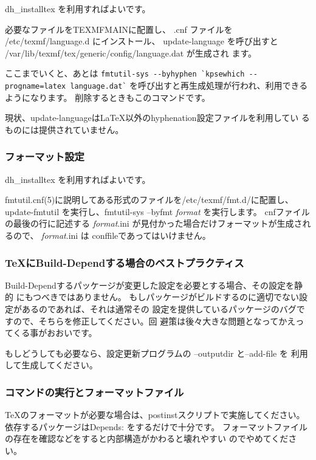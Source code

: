 \documentclass[mingoth,a4paper]{jsarticle}
\begin{document}
dh\_{}installtex を利用すればよいです。

必要なファイルをTEXMFMAINに配置し、
.cnf ファイルを /etc/texmf/language.d にインストール、 update-language
を呼び出すと /var/lib/texmf/tex/generic/config/language.dat が生成され
ます。

ここまでいくと、あとは
\verb!fmtutil-sys --byhyphen `kpsewhich --progname=latex language.dat`!
を呼び出すと再生成処理が行われ、利用できるようになります。
削除するときもこのコマンドです。

現状、update-languageは\LaTeX{}以外のhyphenation設定ファイルを利用してい
るものには提供されていません。

\subsubsection{フォーマット設定}

dh\_{}installtex を利用すればよいです。

fmtutil.cnf(5)に説明してある形式のファイルを/etc/texmf/fmt.d/に配置し、
 update-fmtutil を実行し、fmtutil-sys --byfmt {\it format} を実行します。
cnfファイルの最後の行に記述する {\it format}.ini が見付かった場合だけフォーマットが生成されるので、
 {\it format}.ini は conffileであってはいけません。

\subsubsection{TeXにBuild-Dependする場合のベストプラクティス}

Build-Dependするパッケージが変更した設定を必要とする場合、その設定を静的
にもつべきではありません。
もしパッケージがビルドするのに適切でない設定があるのであれば、それは通常その
設定を提供しているパッケージのバグですので、そちらを修正してください。回
避策は後々大きな問題となってかえってくる事がおおいです。

もしどうしても必要なら、設定更新プログラムの --outputdir と--add-file を
利用して生成してください。


\subsubsection{コマンドの実行とフォーマットファイル}

\TeX{}のフォーマットが必要な場合は、postinstスクリプトで実施してください。
依存するパッケージはDepends: をするだけで十分です。
フォーマットファイルの存在を確認などをすると内部構造がかわると壊れやすい
のでやめてください。
\end{document}
